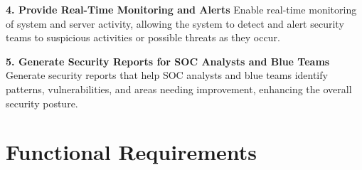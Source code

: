 \textbf{4. Provide Real-Time Monitoring and Alerts}
Enable real-time monitoring of system and server activity, allowing the system to detect and alert security teams to suspicious activities or possible threats as they occur.




\textbf{5. Generate Security Reports for SOC Analysts and Blue Teams}
Generate security reports that help SOC analysts and blue teams identify patterns, vulnerabilities, and areas needing improvement, enhancing the overall security posture.





\section{Functional Requirements}





